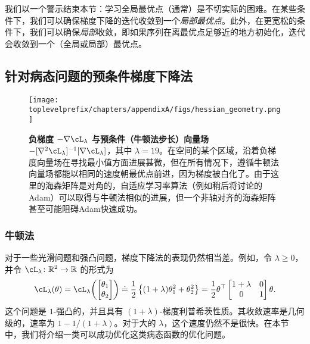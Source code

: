 \documentclass[../../book-main_zh.tex]{subfiles}
\begin{document}
我们以一个警示结束本节：学习全局最优点（通常）是不切实际的困难。在某些条件下，我们可以确保梯度下降的迭代收敛到一个\textit{局部最优点}。此外，在更宽松的条件下，我们可以确保\textit{局部}收敛，即如果序列在离最优点足够近的地方初始化，迭代会收敛到一个（全局或局部）最优点。


\subsection{针对病态问题的预条件梯度下降法}


\begin{figure}
    \texttt{[image: \\toplevelprefix/chapters/appendixA/figs/hessian\_geometry.png]}
    \caption{\small\textbf{负梯度 \(-\nabla \cL_{\lambda}\) 与预条件（牛顿法步长）向量场 \(-[\nabla^{2}\cL_{\lambda}]^{-1}[\nabla \cL_{\lambda}]\)}，其中 \(\lambda = 19\)。在空间的某个区域，沿着负梯度向量场在寻找最小值方面进展甚微，但在所有情况下，遵循牛顿法向量场都能以相同的速度朝最优点前进，因为梯度被白化了。由于这里的海森矩阵是对角的，自适应学习率算法（例如稍后将讨论的Adam）可以取得与牛顿法相似的进展，但一个非轴对齐的海森矩阵甚至可能阻碍Adam快速成功。}
    \label{fig:hessian_geometry}
\end{figure}

\subsubsection{牛顿法}

对于一些光滑问题和强凸问题，梯度下降法的表现仍然相当差。例如，令 \(\lambda \geq 0\)，并令 \(\cL_{\lambda} \colon \R^{2} \to \R\) 的形式为
\begin{equation}
    \cL_{\lambda}(\theta) = \cL_{\lambda}\rp{\mat{\theta_{1} \\ \theta_{2}}} \doteq \frac{1}{2}\bc{(1 + \lambda) \theta_{1}^{2} + \theta_{2}^{2}} = \frac{1}{2}\theta^{\top}\mat{1 + \lambda & 0 \\ 0 & 1}\theta.
\end{equation}
这个问题是 \(1\)-强凸的，并且具有 \((1 + \lambda)\)-梯度利普希茨性质。其收敛速率是几何级的，速率为 \(1 - 1/(1 + \lambda)\)。对于大的 \(\lambda\)，这个速度仍然不是很快。在本节中，我们将介绍一类可以成功优化这类病态函数的优化问题。
\end{document}
